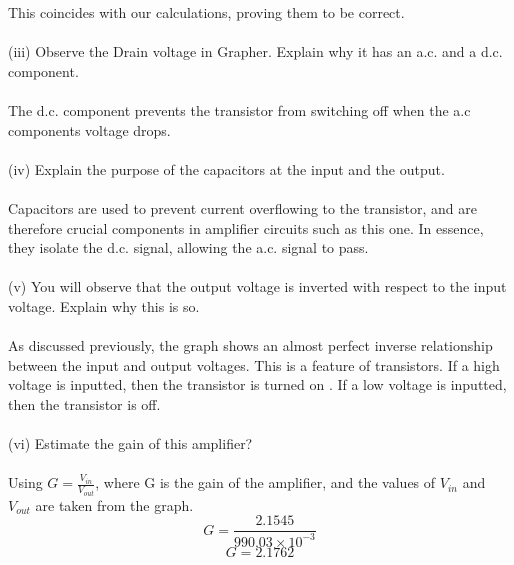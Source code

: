 \documentclass[12pt]{article}
\begin{document}
This coincides with our calculations, proving them to be correct.\\
\\
(iii) Observe the Drain voltage in Grapher. Explain why it has an a.c. and a d.c. component.\\
\\
The d.c. component prevents the transistor from switching off when the a.c components voltage drops.\\
\\
(iv) Explain the purpose of the capacitors at the input and the output.\\
\\
Capacitors are used to prevent current overflowing to the transistor, and are therefore crucial components in amplifier circuits such as this one. In essence, they isolate the d.c. signal, allowing the a.c. signal to pass.\\
\\
(v) You will observe that the output voltage is inverted with respect to the input voltage. Explain why this is so.\\
\\
As discussed previously, the graph shows an almost perfect inverse relationship between the input and output voltages. This is a feature of transistors. If a high voltage is inputted, then the transistor is turned on . If a low voltage is inputted, then the transistor is off.\\
\\
(vi) Estimate the gain of this amplifier?\\
\\
Using \(G = \frac{V_{in}}{V_{out}}\), where G is the gain of the amplifier, and the values of \(V_{in}\) and \(V_{out}\) are taken from the graph.\\
\[G = \frac{2.1545}{990.03 \times 10^{-3}}\]
\[G = 2.1762\]
\end{document}
